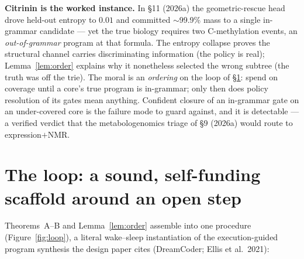 \documentclass[11pt]{article}
\theoremstyle{plain}
\theoremstyle{definition}
\begin{document}
\noindent\textbf{Citrinin is the worked instance.} In \S11 (2026a) the geometric-rescue head drove held-out entropy to $0.01$ and committed $\sim$99.9\% mass to a single in-grammar candidate --- yet the true biology requires two C-methylation events, an \emph{out-of-grammar} program at that formula. The entropy collapse proves the structural channel carries discriminating information (the policy is real); Lemma~\ref{lem:order} explains why it nonetheless selected the wrong subtree (the truth was off the trie). The moral is an \emph{ordering} on the loop of \S\ref{sec:loop}: spend on coverage until a core's true program is in-grammar; only then does policy resolution of its gates mean anything. Confident closure of an in-grammar gate on an under-covered core is the failure mode to guard against, and it is detectable --- a verified verdict that the metabologenomics triage of \S9 (2026a) would route to expression$+$NMR.

\section{The loop: a sound, self-funding scaffold around an open step}
\label{sec:loop}
Theorems~A--B and Lemma~\ref{lem:order} assemble into one procedure (Figure~\ref{fig:loop}), a literal wake--sleep instantiation of the execution-guided program synthesis the design paper cites (DreamCoder; Ellis et al.\ 2021):
\end{document}

